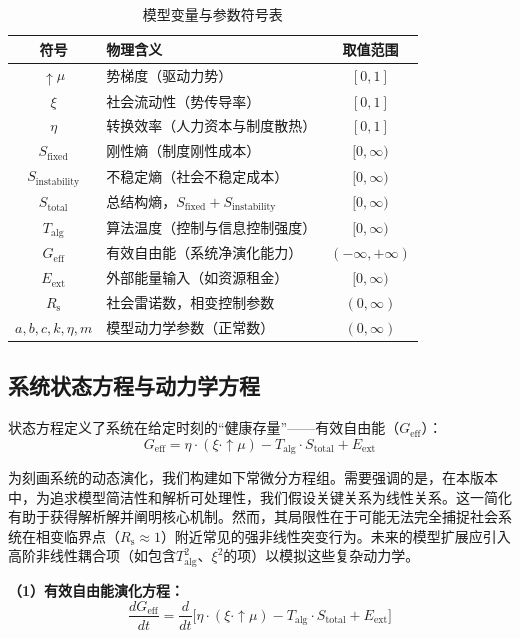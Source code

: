 \documentclass[twocolumn]{ctexart}
\newcommand{\upmu}{\uparrow\!\mu}
\newcommand{\upxi}{\xi}
\newcommand{\upeta}{\eta}
\newcommand{\Sfix}{S_{\mathrm{fixed}}}
\newcommand{\Sinst}{S_{\mathrm{instability}}}
\newcommand{\Stot}{S_{\mathrm{total}}}
\newcommand{\Talg}{T_{\mathrm{alg}}}
\newcommand{\Geff}{G_{\mathrm{eff}}}
\newcommand{\Eext}{E_{\mathrm{ext}}}
\newcommand{\Rs}{R_{\mathrm{s}}}
\begin{document}
\begin{table}[H]
\centering
\caption{模型变量与参数符号表}
\label{tab:variables}
\begin{threeparttable}
\begin{tabular}{clc}
\toprule
符号 & 物理含义 & 取值范围 \\
\midrule
$\upmu$ & 势梯度（驱动力势） & $[0,1]$ \\
$\upxi$ & 社会流动性（势传导率） & $[0,1]$ \\
$\upeta$ & 转换效率（人力资本与制度散热） & $[0,1]$ \\
$\Sfix$ & 刚性熵（制度刚性成本） & $[0,\infty)$ \\
$\Sinst$ & 不稳定熵（社会不稳定成本） & $[0,\infty)$ \\
$\Stot$ & 总结构熵，$\Sfix+\Sinst$ & $[0,\infty)$ \\
$\Talg$ & 算法温度（控制与信息控制强度） & $[0,\infty)$ \\
$\Geff$ & 有效自由能（系统净演化能力） & $(-\infty,+\infty)$ \\
$\Eext$ & 外部能量输入（如资源租金） & $[0,\infty)$ \\
$\Rs$ & 社会雷诺数，相变控制参数 & $(0,\infty)$ \\
$a,b,c,k,\upeta,m$ & 模型动力学参数（正常数） & $(0,\infty)$ \\
\bottomrule
\end{tabular}
\end{threeparttable}
\end{table}

\subsection{系统状态方程与动力学方程}

状态方程定义了系统在给定时刻的“健康存量”——有效自由能（$\Geff$）：
\begin{equation}\label{eq:state}
\Geff = \upeta \cdot (\upxi \cdot \upmu) - \Talg \cdot \Stot + \Eext
\end{equation}

为刻画系统的动态演化，我们构建如下常微分方程组。需要强调的是，在本版本中，为追求模型简洁性和解析可处理性，我们假设关键关系为线性关系。这一简化有助于获得解析解并阐明核心机制。然而，其局限性在于可能无法完全捕捉社会系统在相变临界点（$\Rs\approx1$）附近常见的强非线性突变行为。未来的模型扩展应引入高阶非线性耦合项（如包含$\Talg^2$、$\upxi^2$的项）以模拟这些复杂动力学。

\textbf{（1）有效自由能演化方程：}
\begin{equation}\label{eq:Geff_dot}
\frac{d\Geff}{dt} = \frac{d}{dt}\bigl[\upeta \cdot (\upxi \cdot \upmu) - \Talg \cdot \Stot + \Eext\bigr]
\end{equation}
\end{document}
